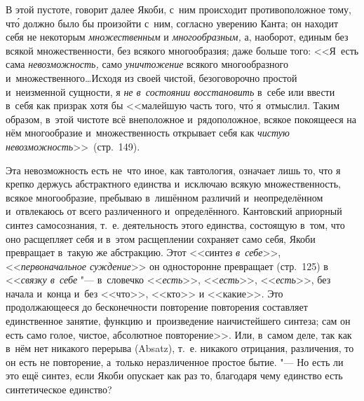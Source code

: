 В этой пустоте, говорит далее Якоби, с~ним происходит противоположное тому,
чт\'{о} должно было бы произойти с~ним, согласно уверению Канта; он находит
себя не некоторым {\em множественным} и {\em многообразным,} а, наоборот,
единым без всякой множественности, без всякого многообразия; даже больше того:
<<Я~есть сама {\em невозможность,} само {\em уничтожение} всякого
многообразного и~множественного\ldots Исходя из своей чистой, безоговорочно
простой и~неизменной сущности, я {\em не в~состоянии восстановить} в~себе или
ввести в~себя как призрак хотя бы <<малейшую часть того, чт\'{о} я~отмыслил.
Таким образом, в~этой чистоте всё внеположное и~рядоположное, всякое покоящееся
на нём многообразие и~множественность открывает себя как
{\em чистую невозможность}>>~(стр.~149).

Эта невозможность есть не~что иное, как тавтология, означает лишь то, что я
крепко держусь абстрактного единства и~исключаю всякую множественность, всякое
многообразие, пребываю в~лишённом различий и~неопределённом и~отвлекаюсь от
всего различенного и~определённого. Кантовский априорный синтез самосознания,
т.~е. деятельность этого единства, состоящую в~том, что оно расщепляет себя и
в~этом расщеплении сохраняет само себя, Якоби превращает в~такую же абстракцию.
Этот <<синтез {\em в~себе}>>, <<{\em первоначальное суждение}>> он односторонне
превращает (стр.~125) в <<{\em связку в~себе} "--- в~словечко <<{\em есть}>>,
<<{\em есть}>>, <<{\em есть}>>, без начала и~конца и~без <<что>>, <<кто>> и
<<какие>>. Это продолжающееся до бесконечности повторение повторения составляет
единственное занятие, функцию и~произведение наичистейшего синтеза; сам он есть
само голое, чистое, абсолютное повторение>>. Или, в~самом деле, так как в~нём
нет никакого перерыва (Ab\-satz), т.~е. никакого отрицания, различения, то он есть не
повторение, а~только неразличенное простое бытие. "--- Но есть ли это ещё
синтез, если Якоби опускает как раз то, благодаря чему единство есть
синтетическое единство?

